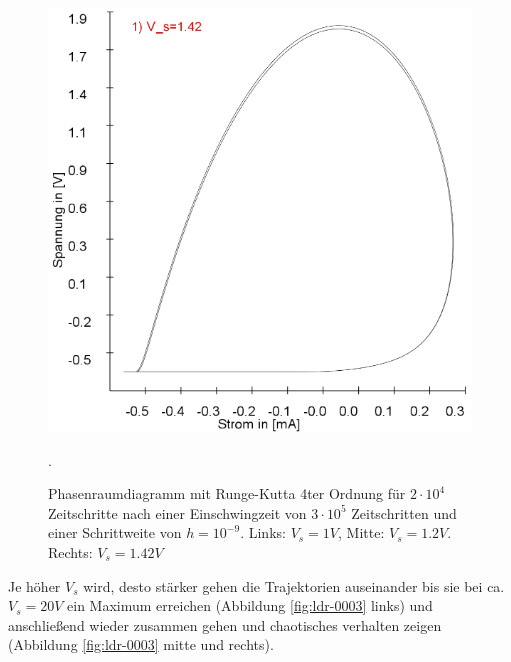 \documentclass{scrartcl}
\begin{document}
\begin{figure}[!htbp]
\includegraphics[scale=0.28]{schwing-runge-nach300k-weitere20k-10-9-1,42V}
\caption{Phasenraumdiagramm mit Runge-Kutta 4ter Ordnung für $2\cdot10^4$ Zeitschritte nach einer Einschwingzeit von  $3\cdot10^5$ Zeitschritten und einer Schrittweite von $h=10^{-9}$. Links: $V_s=1V$, Mitte: $V_s=1.2V$. Rechts: $V_s=1.42V$}. 
\label{fig:ldr-0002}
\end{figure}
Je höher $V_s$ wird, desto stärker gehen die Trajektorien auseinander bis sie bei ca. $V_s=20V$ ein Maximum erreichen (Abbildung \ref{fig:ldr-0003} links) und anschließend wieder zusammen gehen und chaotisches verhalten zeigen (Abbildung \ref{fig:ldr-0003} mitte und rechts).
\end{document}
